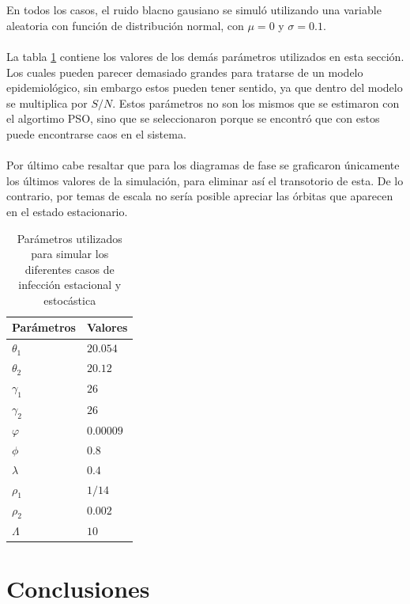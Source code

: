 \documentclass[conference]{IEEEtran}
\begin{document}
\\\\
En todos los casos, el ruido blacno gausiano se simuló utilizando una variable aleatoria
con función de distribución normal, con $\mu = 0$ y $\sigma = 0.1$.
\\\\
La tabla \ref{chaos_params} contiene los valores de los demás parámetros utilizados en esta sección. Los cuales pueden
parecer demasiado grandes para tratarse de un modelo epidemiológico, sin embargo estos pueden tener sentido, 
ya que dentro del modelo se multiplica por $S/N$. Estos parámetros no son los mismos que se estimaron con el 
algortimo PSO, sino que se seleccionaron porque se encontró que con estos puede encontrarse caos en el sistema.
\\\\
Por último cabe resaltar que para los diagramas de fase se graficaron únicamente los últimos valores de la simulación,
para eliminar así el transotorio de esta. De lo contrario, por temas de escala no sería posible apreciar las órbitas
que aparecen en el estado estacionario.
\begin{table}[h]
    \centering
    \begin{tabular}{ll}
    \hline
    Parámetros  & Valores    \\ \hline
    $\theta_1 $ & $20.054$    \\ 
    $\theta_2$  & $20.12$ \\ 
    $\gamma_1$  & $26$    \\ 
    $\gamma_2$  & $26$ \\ 
    $\varphi$   & $0.00009$ \\
    $\phi$      & $0.8$  \\
    $\lambda$   & $0.4$ \\
    $\rho_1 $   & $1/14$ \\ 
    $\rho_2$    & $0.002$ \\
    $\Lambda$    & $10$  \\ \hline
    \end{tabular}
    \caption{Parámetros utilizados para simular los diferentes casos de infección 
    estacional y estocástica}
    \label{chaos_params}
\end{table}




\section{Conclusiones}
\end{document}
